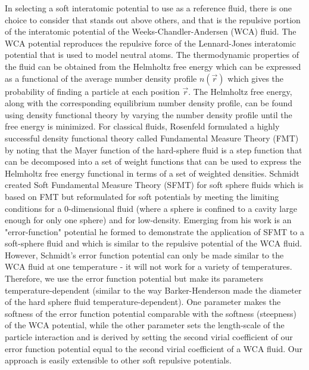 \documentclass[double,12pt]{revtex4-2}
\begin{document}
In selecting a soft interatomic potential to use as a reference fluid, 
there is one choice to consider that stands out above others, and that is 
the repulsive portion of the interatomic potential of the 
Weeks-Chandler-Andersen (WCA) fluid.
The WCA potential reproduces the repulsive force of the Lennard-Jones 
interatomic potential that is used to model neutral atoms. 
The thermodynamic properties of the fluid can be obtained from the 
Helmholtz free energy which
can be expressed as a functional of the average number 
density profile $n(\vec r)$ 
which gives the probability of finding a particle at each position $\vec r$. 
The Helmholtz free energy, along with the corresponding equilibrium number density profile,
can be found using density functional theory by 
varying the number density profile until the free energy is minimized.
For classical fluids, Rosenfeld formulated a highly successful 
density functional theory called Fundamental Measure Theory (FMT)
by noting that the Mayer function of the hard-sphere fluid is a step function
that can be decomposed into a set of weight functions that can be used 
to express the Helmholtz free energy functional in terms of a set of weighted densities. 
Schmidt created Soft Fundamental Measure Theory (SFMT) for soft sphere 
fluids which is based on FMT but reformulated for soft potentials by 
meeting the limiting conditions for a 0-dimensional fluid (where a sphere 
is confined to a cavity large enough for only one sphere) 
and for low-density. 
Emerging from his work is an "error-function" potential he formed to 
demonstrate the application of SFMT to a soft-sphere fluid and which is
similar to the repulsive potential of the WCA fluid. However, 
Schmidt's error function potential can only be made similar to the WCA fluid 
at one temperature -
it will not work for a variety of temperatures. 
Therefore, we use the error function potential but make
its parameters temperature-dependent (similar to the way Barker-Henderson made the
diameter of the hard sphere fluid temperature-dependent).
One parameter makes the softness of the error function potential comparable 
with the softness (steepness) of the WCA potential, while the other parameter 
sets the length-scale of the particle interaction and
is derived by 
setting the second virial coefficient of our error function potential equal to the second virial 
coefficient of a WCA fluid. 
Our approach is easily extensible to other soft repulsive potentials.
\end{document}
